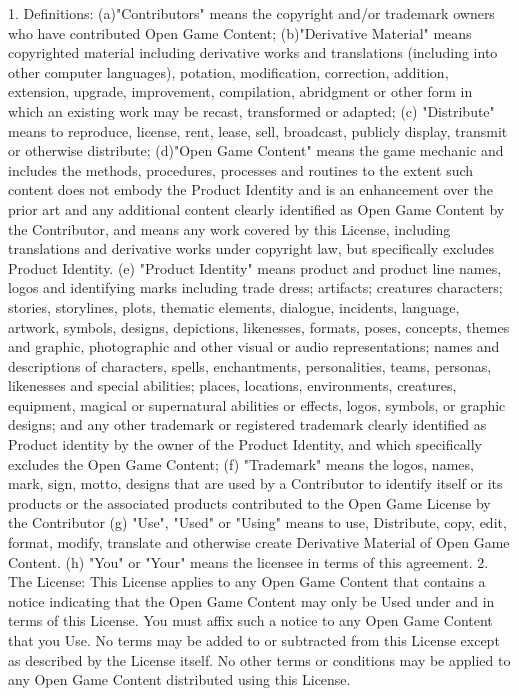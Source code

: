 {1. Definitions: (a)"Contributors" means the copyright and/or trademark owners who have contributed Open Game Content; (b)"Derivative Material" means copyrighted material including derivative works and translations (including into other computer languages), potation, modification, correction, addition, extension, upgrade, improvement, compilation, abridgment or other form in which an existing work may be recast, transformed or adapted; (c) "Distribute" means to reproduce, license, rent, lease, sell, broadcast, publicly display, transmit or otherwise distribute; (d)"Open Game Content" means the game mechanic and includes the methods, procedures, processes and routines to the extent such content does not embody the Product Identity and is an enhancement over the prior art and any additional content clearly identified as Open Game Content by the Contributor, and means any work covered by this License, including translations and derivative works under copyright law, but specifically excludes Product Identity. (e) "Product Identity" means product and product line names, logos and identifying marks including trade dress; artifacts; creatures characters; stories, storylines, plots, thematic elements, dialogue, incidents, language, artwork, symbols, designs, depictions, likenesses, formats, poses, concepts, themes and graphic, photographic and other visual or audio representations; names and descriptions of characters, spells, enchantments, personalities, teams, personas, likenesses and special abilities; places, locations, environments, creatures, equipment, magical or supernatural abilities or effects, logos, symbols, or graphic designs; and any other trademark or registered trademark clearly identified as Product identity by the owner of the Product Identity, and which specifically excludes the Open Game Content; (f) "Trademark" means the logos, names, mark, sign, motto, designs that are used by a Contributor to identify itself or its products or the associated products contributed to the Open Game License by the Contributor (g) "Use", "Used" or "Using" means to use, Distribute, copy, edit, format, modify, translate and otherwise create Derivative Material of Open Game Content. (h) "You" or "Your" means the licensee in terms of this agreement.
2. The License: This License applies to any Open Game Content that contains a notice indicating that the Open Game Content may only be Used under and in terms of this License. You must affix such a notice to any Open Game Content that you Use. No terms may be added to or subtracted from this License except as described by the License itself. No other terms or conditions may be applied to any Open Game Content distributed using this License.
}
